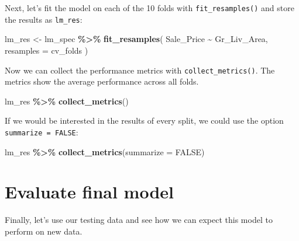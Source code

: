 \documentclass[
]{book}
\newenvironment{Shaded}{\begin{snugshade}}{\end{snugshade}}
\newcommand{\DataTypeTok}[1]{\textcolor[rgb]{0.13,0.29,0.53}{#1}}
\newcommand{\KeywordTok}[1]{\textcolor[rgb]{0.13,0.29,0.53}{\textbf{#1}}}
\newcommand{\NormalTok}[1]{#1}
\newcommand{\OperatorTok}[1]{\textcolor[rgb]{0.81,0.36,0.00}{\textbf{#1}}}
\newcommand{\OtherTok}[1]{\textcolor[rgb]{0.56,0.35,0.01}{#1}}
\newcommand{\StringTok}[1]{\textcolor[rgb]{0.31,0.60,0.02}{#1}}
\begin{document}
Next, let's fit the model on each of the 10 folds with \texttt{fit\_resamples()} and store the results as \texttt{lm\_res}:

\begin{Shaded}
\begin{Highlighting}[]
\NormalTok{lm\_res \textless{}{-}}
\StringTok{  }\NormalTok{lm\_spec }\OperatorTok{\%\textgreater{}\%}
\StringTok{  }\KeywordTok{fit\_resamples}\NormalTok{(}
\NormalTok{    Sale\_Price }\OperatorTok{\textasciitilde{}}\StringTok{ }\NormalTok{Gr\_Liv\_Area,}
    \DataTypeTok{resamples =}\NormalTok{ cv\_folds}
\NormalTok{  )}
\end{Highlighting}
\end{Shaded}

Now we can collect the performance metrics with \texttt{collect\_metrics()}. The metrics show the average performance across all folds.

\begin{Shaded}
\begin{Highlighting}[]
\NormalTok{lm\_res }\OperatorTok{\%\textgreater{}\%}
\StringTok{  }\KeywordTok{collect\_metrics}\NormalTok{()}
\end{Highlighting}
\end{Shaded}

If we would be interested in the results of every split, we could use the option \texttt{summarize\ =\ FALSE}:

\begin{Shaded}
\begin{Highlighting}[]
\NormalTok{lm\_res }\OperatorTok{\%\textgreater{}\%}
\StringTok{  }\KeywordTok{collect\_metrics}\NormalTok{(}\DataTypeTok{summarize =} \OtherTok{FALSE}\NormalTok{)}
\end{Highlighting}
\end{Shaded}

\hypertarget{evaluate-final-model}{%
\chapter{Evaluate final model}\label{evaluate-final-model}}

Finally, let's use our testing data and see how we can expect this model to perform on new data.

\begin{Shaded}
\end{Shaded}
\end{document}
